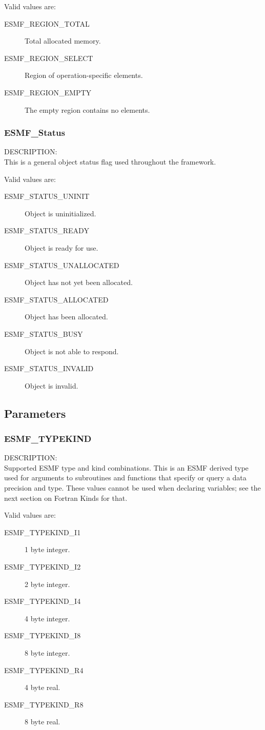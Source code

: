 Valid values are:
\begin{description}
\item [ESMF\_REGION\_TOTAL]
      Total allocated memory.
\item [ESMF\_REGION\_SELECT]
      Region of operation-specific elements.
\item [ESMF\_REGION\_EMPTY]
      The empty region contains no elements.
\end{description}

\subsubsection{ESMF\_Status}
\label{opt:status}
{\sf DESCRIPTION:\\}
This is a general object status flag used throughout the
framework.

Valid values are:
\begin{description}
   \item [ESMF\_STATUS\_UNINIT] 
         Object is uninitialized.
   \item [ESMF\_STATUS\_READY]
         Object is ready for use.
   \item [ESMF\_STATUS\_UNALLOCATED]
         Object has not yet been allocated.
   \item [ESMF\_STATUS\_ALLOCATED]
         Object has been allocated.
   \item [ESMF\_STATUS\_BUSY]
         Object is not able to respond.
   \item [ESMF\_STATUS\_INVALID]
         Object is invalid.
\end{description}


\subsection{Parameters}

\subsubsection{ESMF\_TYPEKIND}
\label{opt:typekind}

{\sf DESCRIPTION:\\}
Supported ESMF type and kind combinations.   
This is an ESMF derived type used for arguments to subroutines 
and functions that specify or query a data precision and type.
These values cannot be used when declaring variables; see the next 
section on Fortran Kinds for that.

Valid values are:
\begin{description}
\item [ESMF\_TYPEKIND\_I1]
      1 byte integer.
\item [ESMF\_TYPEKIND\_I2]
      2 byte integer.
\item [ESMF\_TYPEKIND\_I4]
      4 byte integer.
\item [ESMF\_TYPEKIND\_I8]
      8 byte integer.
\item [ESMF\_TYPEKIND\_R4]
      4 byte real.
\item [ESMF\_TYPEKIND\_R8]
      8 byte real.
\end{description}

